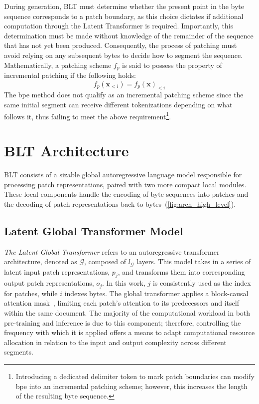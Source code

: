 During generation, {\textsc BLT} must determine whether the present point in the byte sequence corresponds to a patch boundary, as this choice dictates if additional computation through the Latent Transformer is required. Importantly, this determination must be made without knowledge of the remainder of the sequence that has not yet been produced. Consequently, the process of patching must avoid relying on any subsequent bytes to decide how to segment the sequence. Mathematically, a patching scheme $f_p$ is said to possess the property of incremental patching if the following holds:
$$f_p(\pmb{x}_{<i}) = f_p(\pmb{x})_{<i}$$
The bpe method does not qualify as an incremental patching scheme since the same initial segment can receive different tokenizations depending on what follows it, thus failing to meet the above requirement\footnote{Introducing a dedicated delimiter token to mark patch boundaries can modify bpe into an incremental patching scheme; however, this increases the length of the resulting byte sequence.}.

\section{{\textsc BLT} Architecture}
\label{section:architecture}
{\textsc BLT} consists of a sizable global autoregressive language model responsible for processing patch representations, paired with two more compact local modules. These local components handle the encoding of byte sequences into patches and the decoding of patch representations back to bytes~(\autoref{fig:arch_high_level}).

\subsection{Latent Global Transformer Model}

\textit{The Latent Global Transformer} refers to an autoregressive transformer architecture, denoted as $\mathcal{G}$, composed of $l_{\mathcal{G}}$ layers. This model takes in a series of latent input patch representations, $p_j$, and transforms them into corresponding output patch representations, $o_j$. In this work, $j$ is consistently used as the index for patches, while $i$ indexes bytes. The global transformer applies a block-causal attention mask~\citep{dubey2024llama}, limiting each patch’s attention to its predecessors and itself within the same document. The majority of the computational workload in both pre-training and inference is due to this component; therefore, controlling the frequency with which it is applied offers a means to adapt computational resource allocation in relation to the input and output complexity across different segments.


